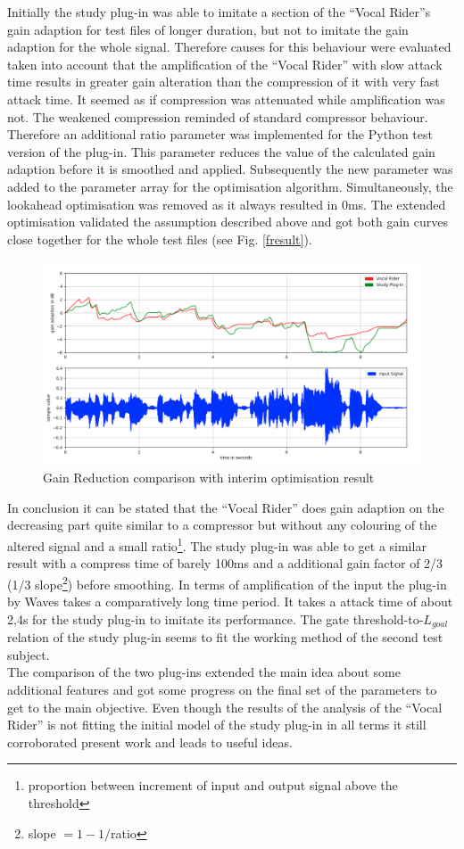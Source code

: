 Initially the study plug-in was able to imitate a section of the “Vocal Rider”s gain adaption for test files of longer duration, but not to imitate the gain adaption for the whole signal. Therefore causes for this behaviour were evaluated taken into account that the amplification of the “Vocal Rider” with slow attack time results in greater gain alteration than the compression of it with very fast attack time. It seemed as if compression was attenuated while amplification was not. The weakened compression reminded of standard compressor behaviour. Therefore an additional ratio parameter was implemented for the Python test version of the plug-in. This parameter reduces the value of the calculated gain adaption before it is smoothed and applied. Subsequently the new parameter was added to the parameter array for the optimisation algorithm. Simultaneously, the lookahead optimisation was removed as it always resulted in 0ms. The extended optimisation validated the assumption described above and got both gain curves close together for the whole test files (see Fig. \ref{fresult}).\\
\begin{figure}
\includegraphics[width=\textwidth]{images/onlyParts}
\caption{Gain Reduction comparison with interim optimisation result}
\end{figure}
In conclusion it can be stated that the “Vocal Rider” does gain adaption on the decreasing part quite similar to a compressor but without any colouring of the altered signal and a small ratio\footnote{proportion between increment of input and output signal above the threshold}. The study plug-in was able to get a similar result with a compress time of barely 100ms and a additional gain factor of 2/3 (1/3 slope\footnote{slope $= 1 - 1/$ratio}) before smoothing. In terms of amplification of the input the plug-in by Waves takes a comparatively long time period. It takes a attack time of about 2,4s for the study plug-in to imitate its performance. The gate threshold-to-$L_{goal}$ relation of the study plug-in seems to fit the working method of the second test subject.\\
The comparison of the two plug-ins extended the main idea about some additional features and got some progress on the final set of the parameters to get to the main objective. Even though the results of the analysis of the “Vocal Rider” is not fitting the initial model of the study plug-in in all terms it still corroborated present work and leads to useful ideas.\\

